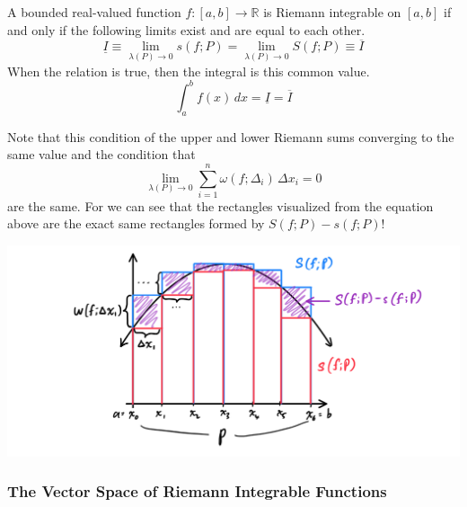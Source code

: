 \documentclass{article}
\begin{document}
      \begin{theorem}
      A bounded real-valued function $f: [a, b] \longrightarrow \mathbb{R}$ is Riemann integrable on $[a, b]$ if and only if the following limits exist and are equal to each other. 
      \[\underline{I} \equiv \lim_{\lambda(P) \rightarrow 0} s(f; P) = \lim_{\lambda(P) \rightarrow 0} S(f; P) \equiv \overline{I}\]
      When the relation is true, then the integral is this common value. 
      \[\int_a^b f(x) \,dx = \underline{I} = \overline{I}\]
      \end{theorem}

      Note that this condition of the upper and lower Riemann sums converging to the same value and the condition that 
      \[\lim_{\lambda(P) \rightarrow 0} \sum_{i = 1}^n \omega (f; \Delta_i) \, \Delta x_i = 0\]
      are the same. For we can see that the rectangles visualized from the equation above are the exact same rectangles formed by $S(f; P) - s(f; P)$! 
      \begin{center}
          \includegraphics[scale=0.3]{img/Equivalent_Conditions_for_Integrability.PNG}
      \end{center}

      \subsubsection{The Vector Space of Riemann Integrable Functions}
\end{document}
